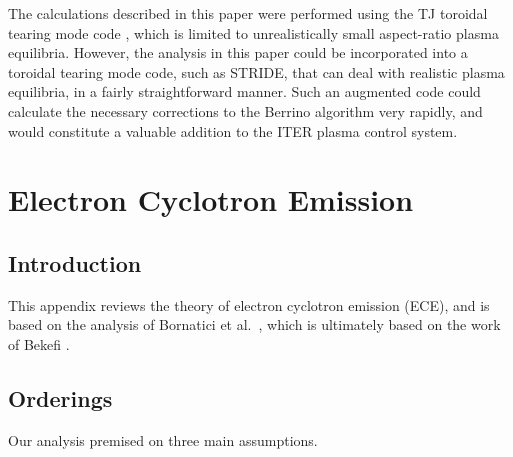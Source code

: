 \documentclass{iopjournal}
\begin{document}
The calculations described in this paper were performed using the TJ toroidal tearing mode code \cite{tear9,tear10}, which is limited to unrealistically small aspect-ratio plasma equilibria. However, the
analysis in this paper could be incorporated into a toroidal tearing mode code, such as STRIDE, that can deal with realistic plasma equilibria, in a fairly
straightforward manner. Such an augmented code could calculate the necessary corrections to the Berrino algorithm very rapidly, and would constitute a
valuable addition to the ITER plasma control system. 



\appendix
\section{Electron Cyclotron Emission}\label{sece}
\subsection{Introduction}
This appendix reviews the theory of electron cyclotron emission (ECE), and is based on the analysis of Bornatici et al.\ \cite{bornatici}, 
which is ultimately based on the work of Bekefi \cite{bekefi}.

\subsection{Orderings}
Our analysis premised on three main assumptions. 
\end{document}
